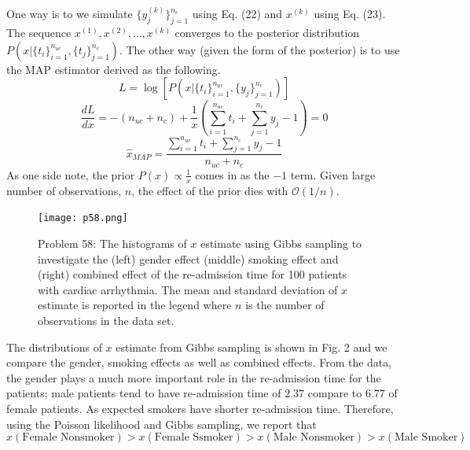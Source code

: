 \documentclass[a4paper, 11pt]{article}
\begin{document}
One way is to we simulate $\{y_j^{(k)} \}_{j=1}^{n_c}$ using Eq. (22) and $x^{(k)}$ using Eq. (23). The sequence $x^{(1)}, x^{(2)}, \dots, x^{(k)}$ converges to the posterior distribution $P(x|\{t_i\}_{i=1}^{n_{uc}}, \{t_j\}_{j=1}^{n_{c}})$. The other way (given the form of the posterior) is to use the MAP estimator derived as the following. 
\begin{equation}
L = \log \left[P\left( x| \{t_i\}_{i=1}^{n_{uc}}, \{y_j\}_{j=1}^{n_{c}} \right)\right]
\end{equation}
\begin{equation}
\frac{dL}{dx} = -(n_{uc}+n_c) + \frac{1}{x}\left(\sum_{i=1}^{n_{uc}}t_i + \sum_{j=1}^{n_c}y_j - 1 \right) = 0
\end{equation}
\begin{equation}
\hat{x}_{MAP} = \frac{\sum_{i=1}^{n_{uc}}t_i + \sum_{j=1}^{n_c}y_j - 1}{n_{uc}+n_c}
\end{equation}
As one side note, the prior $P(x) \propto \frac{1}{x}$ comes in as the $-1$ term. Given large number of observations, $n$, the effect of the prior dies with $\mathcal{O}(1/n)$.

\begin{figure}
	\begin{center}
		\texttt{[image: p58.png]}
		\caption{Problem 58: The histograms of $x$ estimate using Gibbs sampling to investigate the (left) gender effect (middle) smoking effect and (right) combined effect of the re-admission time for 100 patients with cardiac arrhythmia. The mean and standard deviation of $x$ estimate is reported in the legend where $n$ is the number of observations in the data set. } 
	\end{center}
\end{figure}

The distributions of $x$ estimate from Gibbs sampling is shown in Fig. 2 and we compare the gender, smoking effects as well as combined effects. From the data, the gender plays a much more important role in the re-admission time for the patients; male patients tend to have re-admission time of $2.37$ compare to $6.77$ of female patients. As expected smokers have shorter re-admission time. Therefore, using the Poisson likelihood and Gibbs sampling, we report that
\begin{equation}
x(\text{Female Nonsmoker}) > x(\text{Female Ssmoker}) > x(\text{Male Nonsmoker}) > x(\text{Male Smoker})
\end{equation}
\end{document}
